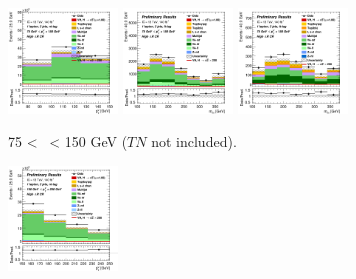 \newpage
\vspace*{\fill} 


\begin{figure}[h!]
    \centering
    \begin{subfigure}[b]{\textwidth}
        \centering
        \includegraphics[width=0.32\textwidth]{Images/VH/Own_fit/prefit_VHcc/Region_distpTV_BMax150_BMin75_DCRHigh_J2_TTypent_T1_L1_Y6051_Prefit.png}
        \includegraphics[width=0.32\textwidth]{Images/VH/Own_fit/prefit_VHcc/Region_distmBB_BMax150_BMin75_DCRHigh_J2_TTypelt_T2_L1_Y6051_Prefit.png}
        \includegraphics[width=0.32\textwidth]{Images/VH/Own_fit/prefit_VHcc/Region_distmBB_BMax150_BMin75_DCRHigh_J2_TTypett_T2_L1_Y6051_Prefit.png}
        \caption{75 < \ptv\ < 150 GeV ($TN$ not included).}
        \label{fig:plots_VHcc_1L_75_CRH_2J}
    \end{subfigure}
    \begin{subfigure}[b]{\textwidth}
        \centering
        \includegraphics[width=0.32\textwidth]{Images/VH/Own_fit/prefit_VHcc/Region_distpTV_BMax250_BMin150_DCRHigh_J2_TTypent_T1_L1_Y6051_Prefit.png}

\end{subfigure}
\end{figure}
